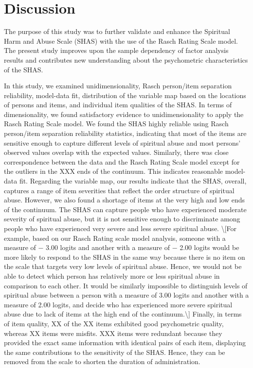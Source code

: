 \documentclass[
  letterpaper,
  DIV=11,
  numbers=noendperiod]{scrreport}
\begin{document}

\hypertarget{discussion}{%
\chapter*{Discussion}\label{discussion}}

The purpose of this study was to further validate and enhance the
Spiritual Harm and Abuse Scale (SHAS) with the use of the Rasch Rating
Scale model. The present study improves upon the sample dependency of
factor analysis results and contributes new understanding about the
psychometric characteristics of the SHAS.

In this study, we examined unidimensionality, Rasch person/item
separation reliability, model-data fit, distribution of the variable map
based on the locations of persons and items, and individual item
qualities of the SHAS. In terms of dimensionality, we found satisfactory
evidence to unidimensionality to apply the Rasch Rating Scale model. We
found the SHAS highly reliable using Rasch person/item separation
reliability statistics, indicating that most of the items are sensitive
enough to capture different levels of spiritual abuse and most persons'
observed values overlap with the expected values. Similarly, there was
close correspondence between the data and the Rasch Rating Scale model
except for the outliers in the XXX ends of the continuum. This indicates
reasonable model-data fit. Regarding the variable map, our results
indicate that the SHAS, overall, captures a range of item severities
that reflect the order structure of spiritual abuse. However, we also
found a shortage of items at the very high and low ends of the
continuum. The SHAS can capture people who have experienced moderate
severity of spiritual abuse, but it is not sensitive enough to
discriminate among people who have experienced very severe and less
severe spiritual abuse. \textbackslash{[}For example, based on our Rasch
Rating scale model analysis, someone with a measure of − 3.00 logits and
another with a measure of − 2.00 logits would be more likely to respond
to the SHAS in the same way because there is no item on the scale that
targets very low levels of spiritual abuse. Hence, we would not be able
to detect which person has relatively more or less spiritual abuse in
comparison to each other. It would be similarly impossible to
distinguish levels of spiritual abuse between a person with a measure of
3.00 logits and another with a measure of 2.00 logits, and decide who
has experienced more severe spiritual abuse due to lack of items at the
high end of the continuum.\textbackslash{]} Finally, in terms of item
quality, XX of the XX items exhibited good psychometric quality, whereas
XX items were misfits. XXX items were redundant because they provided
the exact same information with identical pairs of each item, displaying
the same contributions to the sensitivity of the SHAS. Hence, they can
be removed from the scale to shorten the duration of administration.
\end{document}
